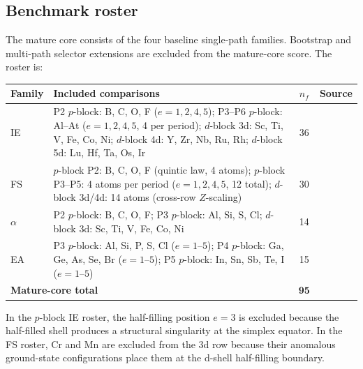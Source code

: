 \documentclass[11pt,a4paper]{article}
\begin{document}
\subsection{Benchmark roster}

The mature core consists of the four baseline single-path families. Bootstrap and multi-path selector extensions are excluded from the mature-core score. The roster is:

\begin{center}
\small
\renewcommand{\arraystretch}{1.1}
\begin{tabular}{lp{7.0cm}cl}
\toprule
Family & Included comparisons & $n_f$ & Source \\
\midrule
IE & P2 $p$-block: B, C, O, F ($e{=}1,2,4,5$); \newline
     P3--P6 $p$-block: Al--At ($e{=}1,2,4,5$, 4 per period); \newline
     $d$-block 3d: Sc, Ti, V, Fe, Co, Ni; \newline
     $d$-block 4d: Y, Zr, Nb, Ru, Rh; \newline
     $d$-block 5d: Lu, Hf, Ta, Os, Ir
     & 36 & \cite{NIST_ASD} \\
\addlinespace
FS & $p$-block P2: B, C, O, F (quintic law, 4 atoms); \newline
     $p$-block P3--P5: 4 atoms per period ($e{=}1,2,4,5$, 12 total); \newline
     $d$-block 3d/4d: 14 atoms (cross-row $Z$-scaling)
     & 30 & \cite{NIST_ASD} \\
\addlinespace
$\alpha$ & P2 $p$-block: B, C, O, F; \newline
           P3 $p$-block: Al, Si, S, Cl; \newline
           $d$-block 3d: Sc, Ti, V, Fe, Co, Ni
           & 14 & \cite{Schwerdtfeger2019} \\
\addlinespace
EA & P3 $p$-block: Al, Si, P, S, Cl ($e{=}1$--$5$); \newline
     P4 $p$-block: Ga, Ge, As, Se, Br ($e{=}1$--$5$); \newline
     P5 $p$-block: In, Sn, Sb, Te, I ($e{=}1$--$5$)
     & 15 & \cite{NIST_ASD} \\
\midrule
\multicolumn{2}{l}{\textbf{Mature-core total}} & $\mathbf{95}$ & \\
\bottomrule
\end{tabular}
\end{center}

In the $p$-block IE roster, the half-filling position $e = 3$ is excluded because the half-filled shell produces a structural singularity at the simplex equator. In the FS roster, Cr and Mn are excluded from the 3d row because their anomalous ground-state configurations place them at the d-shell half-filling boundary.
\end{document}
